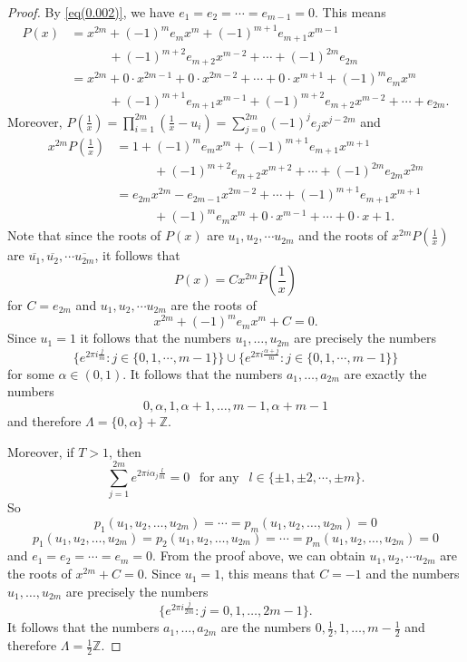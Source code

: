 \documentclass[12pt,a4paper,intlimits,sumlimits]{amsart}
\theoremstyle{plain}
\theoremstyle{definition}
\newcommand{\ZZ}{{\mathbb Z}}
\begin{document}
\begin{proof}
By \eqref{eq(0.002)}, we have $e_1 =e_2 = \cdots =e_{m-1}=0$. This means 
\begin{align*}
P(x) &= x^{2m}+(-1)^{m}e_{m} x^{m}+(-1)^{m+1}e_{m+1} x^{m-1}\\
  &\hspace{3em} +(-1)^{m+2}e_{m+2} x^{m-2}+\cdots+(-1)^{2m}e_{2m}\\
 &= x^{2m}+0\cdot x^{2m-1}+0\cdot x^{2m-2}+\cdots +0\cdot x^{m+1} + (-1)^{m}e_{m}  x^{m} \\
 &\hspace{3em}+(-1)^{m+1}e_{m+1} x^{m-1}+(-1)^{m+2}e_{m+2} x^{m-2}+\cdots+e_{2m}.
\end{align*}
Moreover, $P\left(\frac{1}{x}\right) =\prod_{i=1}^{2m}\left(\frac{1}{x}-u_i\right)=\sum_{j=0}^{2m}(-1)^j e_j x^{j-2m}$ and 
\begin{align*} 
x^{2m}P\left(\frac{1}{x}\right)& = 1+(-1)^{m}e_{m} x^{m} +(-1)^{m+1}e_{m+1} x^{m+1}\\
 &\hspace{3em}+(-1)^{m+2}e_{m+2} x^{m+2}+\cdots+(-1)^{2m}e_{2m}x^{2m}
\\&= e_{2m}x^{2m} - e_{2m-1} x^{2m-2}+\cdots
+ (-1)^{m+1}e_{m+1}x^{m+1}  \\
&\hspace{3em} + (-1)^{m }e_{m } x^{m}  +0\cdot x^{m-1}+\cdots+ 0\cdot x  +1.
\end{align*}
Note that   since the roots of $P(x)$ are $u_1, u_2,\cdots u_{2m}$ and  the roots of $x^{2m}P(\frac{1}{x})$  are $\overline{u_1}, \overline{u_2},\cdots \overline{u_{2m}}$, it follows that  $$P(x)=Cx^{2m}\overline{P}(\frac{1}{x})$$ for $C = e_{2m}$ and  $u_1, u_2,\cdots u_{2m}$  are  the roots of $$x^{2m}+(-1)^{m}e_m x^m+C=0.$$
Since  $u_1=1$ it follows that the numbers $u_1, \ldots, u_{2m}$ are precisely the numbers  $$\{e^{2\pi i  \frac{j}{m}}: j\in\{0,1, \cdots, m-1\}\}\cup\{e^{2\pi i  \frac{\alpha+j}{m}}: j\in\{0,1, \cdots, m-1\}  \}$$ for some $\alpha\in(0, 1)$. It follows that  the numbers $a_1, \ldots, a_{2m}$ are  exactly the numbers
$$0, \alpha, 1, \alpha+1, \ldots, m-1, \alpha+m-1$$ and therefore 
$ \Lambda=\{0, \alpha\}+\mathbb{Z}$.

Moreover, if $T>1$, then 
$$
\sum_{j=1}^{2m} e^{2 \pi i \alpha_j\frac{l}{m}}=0\ \ \text{ for any }\ \ l\in\{ \pm 1,  \pm2, \cdots,  \pm  m\}.
$$
So
\ifdefined\SMART
$$p_1\left(u_1, u_2, \ldots, u_{2m}\right)=\cdots=p_m\left(u_1, u_2, \ldots, u_{2m}\right)=0$$
\else
$$p_1\left(u_1, u_2, \ldots, u_{2m}\right)=p_2\left(u_1, u_2, \ldots, u_{2m}\right)=\cdots=p_m\left(u_1, u_2, \ldots, u_{2m}\right)=0$$
\fi
and $e_1=e_2=\cdots=e_m=0$. From the proof above, we can obtain $ u_1, u_2,\cdots u_{2m}$  are  the roots of $x^{2m}+C=0$. Since  $u_1=1$, this means that $C=-1$ and the numbers $u_1, \ldots, u_{2m}$ are precisely the numbers $$ \{e^{2\pi i\frac{j}{2m}}: j=0, 1, \ldots, 2m-1\}.$$ It follows that  the numbers $a_1, \ldots, a_{2m}$ are the numbers
$0, \frac12, 1, \ldots, m-\frac12$ and therefore $\Lambda = \frac12\ZZ$.

\end{proof}
\end{document}
